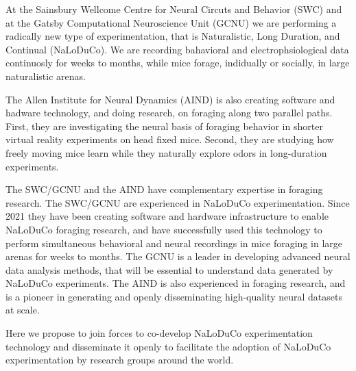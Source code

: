 At the Sainsbury Wellcome Centre for Neural Circuts and Behavior (SWC) and at
the Gatsby Computational Neuroscience Unit (GCNU) we are performing a radically
new type of experimentation, that is Naturalistic, Long Duration, and Continual
(NaLoDuCo). We are recording bahavioral and electrophsiological data
continuosly for weeks to months, while mice forage, indidually or socially, in
large naturalistic arenas.

The Allen Institute for Neural Dynamics (AIND) is also creating software and
hadware technology, and doing research, on foraging along two parallel paths.
First, they are investigating the neural basis of foraging behavior in shorter
virtual reality experiments on head fixed mice. Second, they are studying how
freely moving mice learn while they naturally explore odors in long-duration
experiments.

The SWC/GCNU and the AIND have complementary expertise in foraging research.
%
The SWC/GCNU are experienced in NaLoDuCo experimentation. Since 2021 they have
been creating software and hardware infrastructure to enable NaLoDuCo foraging
research, and have successfully used this technology to perform simultaneous
behavioral and neural recordings in mice foraging in large arenas for weeks to
months.
%
The GCNU is a leader in developing advanced neural data analysis methods, that
will be essential to understand data generated by NaLoDuCo experiments.
%
The AIND is also experienced in foraging research, and is a pioneer in
generating and openly disseminating high-quality neural datasets at scale.

Here we propose to join forces to co-develop NaLoDuCo experimentation
technology and disseminate it openly to facilitate the adoption of NaLoDuCo
experimentation by research groups around the world.

